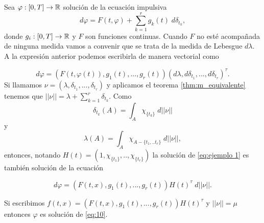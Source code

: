  \begin{example}
 	Sea $\varphi:[0,T]\to\mathbb{R}$ solución de la ecuación impulsiva
 	\begin{equation}
 		d\varphi=F(t,\varphi)+\sum_{k=1}^rg_k(t)\;d\delta_{t_k},\label{eq:ejemplo 1}
 	\end{equation}
  donde $g_i:[0,T]\to \mathbb{R}$ y $F$ son funciones continuas. Cuando $F$ no esté acompañada de ninguna medida  vamos a convenir que se trata de la medida de Lebesgue $d\lambda$. A la expresión anterior  podemos escribirla de manera vectorial como


  
 	\begin{equation*}
	d\varphi=\left( F(t,\varphi(t)),g_1(t),...,g_r(t)\right)  \left( d\lambda, d\delta_{t_1},...,d\delta_{t_r}\right)^\tau. 
\end{equation*} 
 Si llamamos $\nu=(\lambda,\delta_{t_1},...,\delta_{t_r})$ y aplicamos el teorema \eqref{thm:m_equivalente} tenemos que  $||\nu||=\displaystyle\lambda+\sum_{k=1}^r\delta_{t_k}$. Como
$$\delta_{t_k}(A)=\int_A  \chi_{\{t_k\}}\; d||\nu||$$
y
$$\lambda(A)=\int_A \chi_{A-\{t_1,..t_r\}}\; d||\nu||,$$
entonces, notando $H(t)=(1,\chi_{\{t_1\}},..,\chi_{\{t_r\}})$  la solución de \eqref{eq:ejemplo 1} es también solución de la ecuación 

 	\begin{equation*}
	d\varphi=\left(F(t,x),g_1(t),...,g_r(t)\right)H(t)^\tau \; d||\nu||.
\end{equation*} 

 

Si escribimos $f(t,x)=(F(t,x),g_1(t),...,g_r(t))H(t)^\tau$ y $||\nu||=\mu$ entonces  $\varphi$ es solución de \eqref{eq:10}.

 \end{example}

